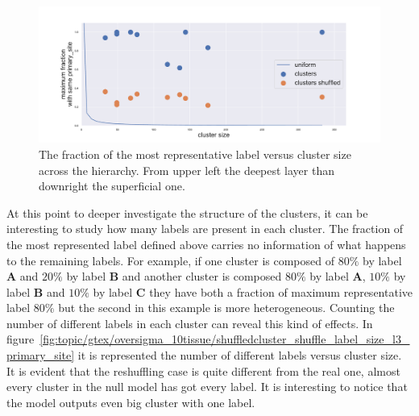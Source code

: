 \begin{figure}[htb!]
\begin{minipage}{0.45\textwidth}
	\end{minipage}
	\hspace{3mm}
	\begin{minipage}{0.45\textwidth}
		\includegraphics[width=0.9\linewidth]{pictures/topic/gtex/oversigma_10tissue/shuffledclusterhomosize_l3_primary_site.pdf}
	\end{minipage}
	\caption{The fraction of the most representative label versus cluster size across the hierarchy. From upper left the deepest layer than downright the superficial one.}
	\label{fig:topic/gtex/oversigma_10tissue/shuffledclusterhomosize_l*}
\end{figure}
\FloatBarrier
At this point to deeper investigate the structure of the clusters, it can be interesting to study how many labels are present in each cluster. The fraction of the most represented label defined above carries no information of what happens to the remaining labels. For example, if one cluster is composed of $80\%$ by label \textbf{A} and $20\%$ by label \textbf{B} and another cluster is composed $80\%$ by label \textbf{A}, $10\%$ by label \textbf{B} and $10\%$ by label \textbf{C} they have both a fraction of maximum representative label $80\%$ but the second in this example is more heterogeneous. Counting the number of different labels in each cluster can reveal this kind of effects. In figure~\ref{fig:topic/gtex/oversigma_10tissue/shuffledcluster_shuffle_label_size_l3_primary_site} it is represented the number of different labels versus cluster size. It is evident that the reshuffling case is quite different from the real one, almost every cluster in the null model has got every label. It is interesting to notice that the model outputs even big cluster with one label.

